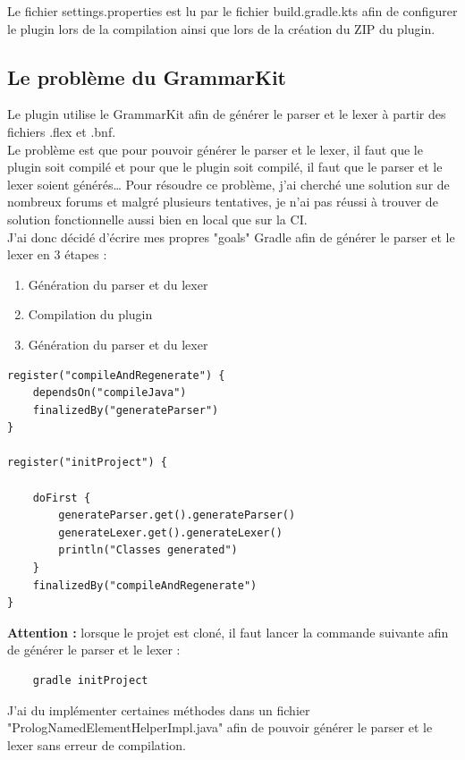 Le fichier settings.properties est lu par le fichier build.gradle.kts afin de configurer le plugin lors de la compilation ainsi que lors de la création du ZIP du plugin.

\subsection{Le problème du GrammarKit}
\noindent
Le plugin utilise le GrammarKit afin de générer le parser et le lexer à partir des fichiers .flex et .bnf.
\\ \noindent Le problème est que pour pouvoir générer le parser et le lexer, il faut que le plugin soit compilé et pour que le plugin soit compilé, il faut que le parser et le lexer soient générés\ldots
\newdoubleline
Pour résoudre ce problème, j'ai cherché une solution sur de nombreux forums et malgré plusieurs tentatives, je n'ai pas réussi à trouver de solution fonctionnelle aussi bien en local que sur la CI.
\\ \noindent J'ai donc décidé d'écrire mes propres "goals" Gradle afin de générer le parser et le lexer en 3 étapes :
\begin{enumerate}
    \item Génération du parser et du lexer
    \item Compilation du plugin
    \item Génération du parser et du lexer
\end{enumerate}


\begin{lstlisting}
register("compileAndRegenerate") {
    dependsOn("compileJava")
    finalizedBy("generateParser")
}

register("initProject") {

    doFirst {
        generateParser.get().generateParser()
        generateLexer.get().generateLexer()
        println("Classes generated")
    }
    finalizedBy("compileAndRegenerate")
}
\end{lstlisting}

\noindent \textbf{Attention :} lorsque le projet est cloné, il faut lancer la commande suivante afin de générer le parser et le lexer :
\begin{lstlisting}
    gradle initProject
\end{lstlisting}

\noindent J'ai du implémenter certaines méthodes dans un fichier "PrologNamedElementHelperImpl.java" afin de pouvoir générer le parser et le lexer sans erreur de compilation.

